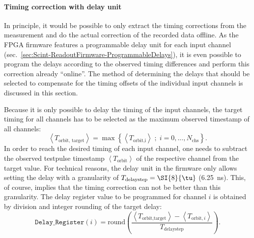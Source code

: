 \paragraph{Timing correction with delay unit}
In principle, it would be possible to only extract the timing corrections from the measurement and do the actual correction of the recorded data offline. As the \ac{FPGA} firmware features a programmable delay unit for each input channel (sec.\ \ref{sec:Scint-ReadoutFirmware-ProgrammableDelays}), it is even possible to program the delays according to the observed timing differences and perform this correction already \enquote{online}. The method of determining the delays that should be selected to compensate for the timing offsets of the individual input channels is discussed in this section.
\par Because it is only possible to delay the timing of the input channels, the target timing for all channels has to be selected as the maximum observed timestamp of all channels:
\begin{equation}
    \left\langle T_\text{orbit, target} \right\rangle = \max \left\{ \left\langle T_\text{{orbit},i} \right\rangle \; ; \; i=0,...,N_\text{chs} \right\} .
    \label{eq:ScintData-TimingBias-TimingTarget}
\end{equation}
In order to reach the desired timing of each input channel, one needs to subtract the observed testpulse timestamp $\left\langle T_\text{orbit} \right\rangle$ of the respective channel from the target value. For technical reasons, the delay unit in the firmware only allows setting the delay with a granularity of $T_\text{delaystep}=\SI{8}{\tu}$ (\SI{6.25}{\nano\second}). This, of course, implies that the timing correction can not be better than this granularity. The delay register value to be programmed for channel $i$ is obtained by division and integer rounding of the target delay:
\begin{equation}
    \texttt{Delay\_Register}(i) = \text{round}\left( \frac{\left\langle T_\text{orbit,target} \right\rangle - \left\langle T_{\text{orbit},i} \right\rangle}{T_\text{delaystep}} \right) .
    \label{eq:ScintData-TimingBias-DelayRegisterValue}
\end{equation}
